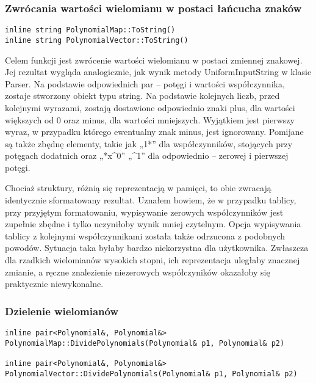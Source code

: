 \documentclass[twoside,a4paper]{book}
\begin{document}
\subsubsection{Zwrócania wartości wielomianu w postaci łańcucha znaków}
\begin{lstlisting}
inline string PolynomialMap::ToString()
inline string PolynomialVector::ToString()
\end{lstlisting}

Celem funkcji jest zwrócenie wartości wielomianu w postaci zmiennej znakowej. Jej rezultat wygląda analogicznie, jak wynik metody UniformInputString w klasie Parser. Na podstawie odpowiednich par – potęgi i wartości współczynnika, zostaje stworzony obiekt typu string. Na podstawie kolejnych liczb, przed kolejnymi wyrazami, zostają dostawione odpowiednio znaki plus, dla wartości większych od 0 oraz minus, dla wartości mniejszych. Wyjątkiem jest pierwszy wyraz, w przypadku którego ewentualny znak minus, jest ignorowany. Pomijane są także zbędnę elementy, takie jak „1*” dla współczynników, stojących przy potęgach dodatnich oraz „*x\^{}0” „\^{}1” dla odpowiednio – zerowej i pierwszej potęgi.

Chociaż struktury, różnią się reprezentacją w pamięci, to obie zwracają identycznie sformatowany rezultat. Uznałem bowiem, że w przypadku tablicy, przy przyjętym formatowaniu, wypisywanie zerowych współczynników jest zupełnie zbędne i tylko uczyniłoby wynik mniej czytelnym. Opcja wypisywania tablicy z kolejnymi współczynnikami została także odrzucona z podobnych powodów. Sytuacja taka byłaby bardzo niekorzystna dla użytkownika. Zwłaszcza dla rzadkich wielomianów wysokich stopni, ich reprezentacja uległaby znacznej zmianie, a ręczne znalezienie niezerowych współczyników okazałoby się praktycznie niewykonalne. 
\\

\subsubsection{Dzielenie wielomianów}
\begin{lstlisting}
inline pair<Polynomial&, Polynomial&>
PolynomialMap::DividePolynomials(Polynomial& p1, Polynomial& p2)

inline pair<Polynomial&, Polynomial&>
PolynomialVector::DividePolynomials(Polynomial& p1, Polynomial& p2)
\end{lstlisting}
\end{document}
